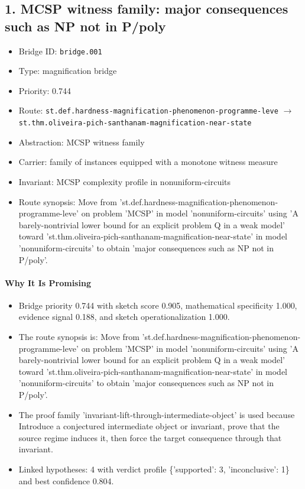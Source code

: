 \documentclass[11pt]{article}
\begin{document}
\subsection{1. MCSP witness family: major consequences such as NP not in P/poly}
\begin{itemize}[leftmargin=*,itemsep=0.25em]
\item Bridge ID: \texttt{bridge.001}
\item Type: magnification bridge
\item Priority: 0.744
\item Route: \texttt{st.def.hardness-magnification-phenomenon-programme-leve} $\rightarrow$ \texttt{st.thm.oliveira-pich-santhanam-magnification-near-state}
\item Abstraction: MCSP witness family
\item Carrier: family of instances equipped with a monotone witness measure
\item Invariant: MCSP complexity profile in nonuniform-circuits
\item Route synopsis: Move from 'st.def.hardness-magnification-phenomenon-programme-leve' on problem 'MCSP' in model 'nonuniform-circuits' using 'A barely-nontrivial lower bound for an explicit problem Q in a weak model' toward 'st.thm.oliveira-pich-santhanam-magnification-near-state' in model 'nonuniform-circuits' to obtain 'major consequences such as NP not in P/poly'.
\end{itemize}
\paragraph{Why It Is Promising}
\begin{itemize}[leftmargin=*,itemsep=0.2em]
\item Bridge priority 0.744 with sketch score 0.905, mathematical specificity 1.000, evidence signal 0.188, and sketch operationalization 1.000.
\item The route synopsis is: Move from 'st.def.hardness-magnification-phenomenon-programme-leve' on problem 'MCSP' in model 'nonuniform-circuits' using 'A barely-nontrivial lower bound for an explicit problem Q in a weak model' toward 'st.thm.oliveira-pich-santhanam-magnification-near-state' in model 'nonuniform-circuits' to obtain 'major consequences such as NP not in P/poly'.
\item The proof family 'invariant-lift-through-intermediate-object' is used because Introduce a conjectured intermediate object or invariant, prove that the source regime induces it, then force the target consequence through that invariant.
\item Linked hypotheses: 4 with verdict profile \{'supported': 3, 'inconclusive': 1\} and best confidence 0.804.
\end{itemize}
\end{document}
